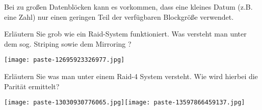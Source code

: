 \documentclass{article}
\begin{document}
\begin{tcolorbox}[colback=white!10!white,colframe=lightgray!75!black,
  savelowerto=\jobname_ex.tex]

\begin{center}
Bei zu großen Datenblöcken kann es vorkommen, dass eine kleines Datum (z.B. eine Zahl) nur einen geringen Teil der verfügbaren Blockgröße verwendet.

\end{center}

\tcblower

\justifying

\end{tcolorbox}
\begin{tcolorbox}[colback=white!10!white,colframe=lightgray!75!black,
  savelowerto=\jobname_ex.tex]

\begin{center}
 Erläutern Sie grob wie ein Raid-System funktioniert. Was versteht man unter dem sog. 
Striping
sowie dem 
Mirroring
? 

\end{center}

\tcblower

\justifying
\texttt{[image: paste-12695923326977.jpg]}
\end{tcolorbox}
\begin{tcolorbox}[colback=white!10!white,colframe=lightgray!75!black,
  savelowerto=\jobname_ex.tex]

\begin{center}
 Erläutern Sie was man unter einem 
Raid-4 System
versteht. Wie wird hierbei die Parität ermittelt? 

\end{center}

\tcblower

\justifying
\texttt{[image: paste-13030930776065.jpg]}\texttt{[image: paste-13597866459137.jpg]}
\end{tcolorbox}
\end{document}
